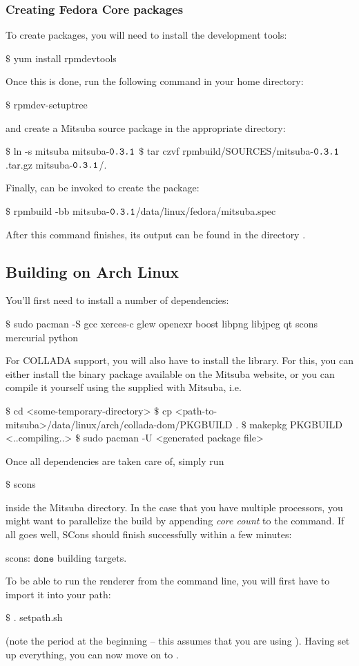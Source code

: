 \subsubsection{Creating Fedora Core packages}
To create  packages, you will need to install the  development tools:
\begin{shell}
$\text{\$}$ yum install rpmdevtools
\end{shell}
Once this is done, run the following command in your home directory:
\begin{shell}
$\text{\$}$ rpmdev-setuptree
\end{shell}
and create a Mitsuba source package in the appropriate directory:
\begin{shell}
$\text{\$}$ ln -s mitsuba mitsuba-$\texttt{0.3.1}$
$\text{\$}$ tar czvf rpmbuild/SOURCES/mitsuba-$\texttt{0.3.1}$.tar.gz mitsuba-$\texttt{0.3.1}$/.
\end{shell}
Finally,  can be invoked to create the package:
\begin{shell}
$\text{\$}$ rpmbuild -bb mitsuba-$\texttt{0.3.1}$/data/linux/fedora/mitsuba.spec
\end{shell}
After this command finishes, its output can be found in the directory .
\subsection{Building on Arch Linux}
You'll first need to install a number of dependencies: 
\begin{shell}
$\text{\$}$ sudo pacman -S gcc xerces-c glew openexr boost libpng libjpeg qt scons mercurial python
\end{shell}
For COLLADA support, you will also have to install the 
library. For this, you can either install the binary package available on
the Mitsuba website, or you can compile it yourself using the 
supplied with Mitsuba, i.e.
\begin{shell}
$\text{\$}$ cd <some-temporary-directory>
$\text{\$}$ cp <path-to-mitsuba>/data/linux/arch/collada-dom/PKGBUILD .
$\text{\$}$ makepkg PKGBUILD
<..compiling..>
$\text{\$}$ sudo pacman -U <generated package file>
\end{shell}
Once all dependencies are taken care of, simply run
\begin{shell}
$\text{\$}$ scons
\end{shell}
inside the Mitsuba directory. In the case that you have multiple processors, you might want to parallelize the build by appending \emph{core count} to the command.
If all goes well, SCons should finish successfully within a few minutes:
\begin{shell}
scons: $\texttt{done}$ building targets.
\end{shell}
To be able to run the renderer from the command line, you will first have to import it into your path:
\begin{shell}
$\text{\$}$ . setpath.sh
\end{shell}
(note the period at the beginning -- this assumes that you are using ).
Having set up everything, you can now move on to .
